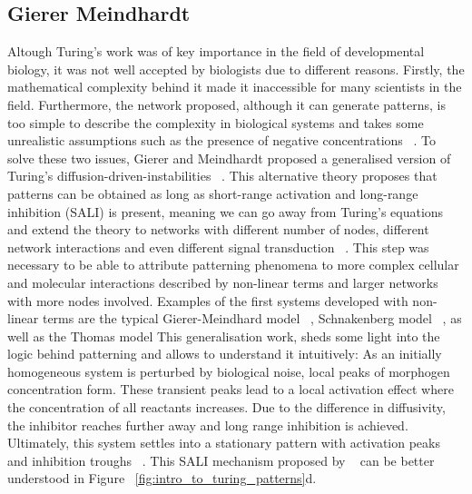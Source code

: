 \subsection{Gierer Meindhardt}
Altough Turing’s work was of key importance in the field of developmental biology, it was not well accepted by biologists due to different reasons.
Firstly, the mathematical complexity behind it made it inaccessible for many scientists in the field.
Furthermore, the network proposed, although it can generate patterns, is too simple to describe the complexity in biological systems and takes some unrealistic assumptions such as the presence of negative concentrations ~\parencite{Kondo2010a}.
To solve these two issues, Gierer and Meindhardt proposed a generalised version of Turing’s diffusion-driven-instabilities ~\parencite{Gierer1972}.
This alternative theory proposes that patterns can be obtained as long as short-range activation and long-range inhibition (SALI) is present, meaning we can go away from Turing’s equations and extend the theory to networks with different number of nodes, different network interactions and even different signal transduction ~\parencite{Murray1983, Rauch2004, Swindale1980}.
This step was necessary to be able to attribute patterning phenomena to more complex cellular and molecular interactions described by non-linear terms and larger networks with more nodes involved.
Examples of the first systems developed with non-linear terms are the typical Gierer-Meindhard model ~\parencite{Gierer1972}, Schnakenberg model ~\parencite{Schnakenberg1979}, as well as the Thomas model %
This generalisation work, sheds some light into the logic behind patterning and allows to understand it intuitively:
As an initially homogeneous system is perturbed by biological noise, local peaks of morphogen concentration form.
These transient peaks lead to a local activation effect where the concentration of all reactants increases.
Due to the difference in diffusivity, the inhibitor reaches further away and long range inhibition is achieved.
Ultimately, this system settles into a stationary pattern with activation peaks and inhibition troughs ~\parencite{Gierer1972}.
This SALI mechanism proposed by ~\cite{Gierer1972} can be better understood in Figure ~\ref{fig:intro_to_turing_patterns}d.
